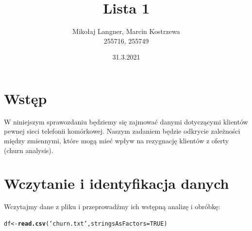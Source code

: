 \documentclass{article}\usepackage[]{graphicx}\usepackage[]{color}
\title{Lista 1}
\author{Mikołaj Langner, Marcin Kostrzewa \\ 255716, 255749}
\date{31.3.2021}
\makeatletter
\newcommand{\hlnum}[1]{\textcolor[rgb]{0.686,0.059,0.569}{#1}}%
\newcommand{\hlstr}[1]{\textcolor[rgb]{0.192,0.494,0.8}{#1}}%
\newcommand{\hlstd}[1]{\textcolor[rgb]{0.345,0.345,0.345}{#1}}%
\newcommand{\hlkwb}[1]{\textcolor[rgb]{0.69,0.353,0.396}{#1}}%
\newcommand{\hlkwc}[1]{\textcolor[rgb]{0.333,0.667,0.333}{#1}}%
\newcommand{\hlkwd}[1]{\textcolor[rgb]{0.737,0.353,0.396}{\textbf{#1}}}%
\newenvironment{kframe}{%
 \def\at@end@of@kframe{}%
 \ifinner\ifhmode%
  \def\at@end@of@kframe{\end{minipage}}%
  \begin{minipage}{\columnwidth}%
 \fi\fi%
 \def\FrameCommand##1{\hskip\@totalleftmargin \hskip-\fboxsep
 \colorbox{shadecolor}{##1}\hskip-\fboxsep
     \hskip-\linewidth \hskip-\@totalleftmargin \hskip\columnwidth}%
 \MakeFramed {\advance\hsize-\width
   \@totalleftmargin\z@ \linewidth\hsize
   \@setminipage}}%
 {\par\unskip\endMakeFramed%
 \at@end@of@kframe}
\newenvironment{knitrout}{}{} %
\makeatother
\begin{document}
\maketitle

\section{Wstęp}
W niniejszym sprawozdaniu będziemy się zajmować danymi dotyczącymi klientów pewnej sieci telefonii komórkowej.
Naszym zadaniem będzie odkrycie zależności między zmiennymi, które mogą mieć wpływ na rezygnację klientów z oferty (churn analysis).

\section{Wczytanie i identyfikacja danych}
Wczytajmy dane z pliku i przeprowadźmy ich wstępną analizę i obróbkę:

\begin{knitrout}
\color{fgcolor}\begin{kframe}
\begin{alltt}
\hlstd{df} \hlkwb{<-} \hlkwd{read.csv}\hlstd{(}\hlstr{'churn.txt'}\hlstd{,} \hlkwc{stringsAsFactors} \hlstd{=} \hlnum{TRUE}\hlstd{)}
\end{alltt}
\end{kframe}
\end{knitrout}
\end{document}
